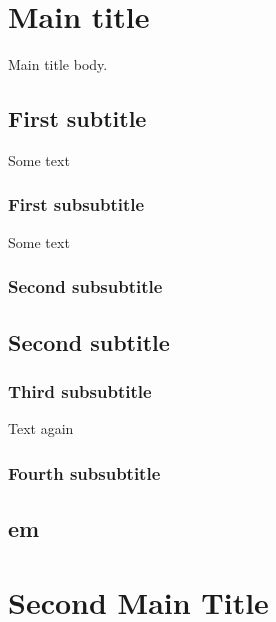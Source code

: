 \chapter{Main title}
Main title body.

\section{First subtitle}
Some text

\subsection{First subsubtitle}
Some text


\subsection{Second subsubtitle}




\section{Second subtitle}

\subsection{Third subsubtitle}
Text again


\subsection{Fourth subsubtitle}



\section{em}


\chapter{Second Main Title}

